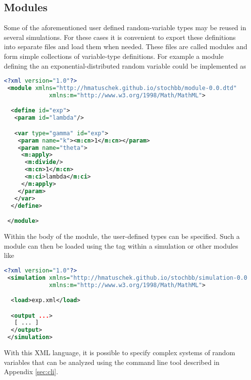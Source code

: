 \subsection{Modules}
Some of the aforementioned user defined random-variable types may be reused in several
simulations. For these cases it is convenient to export these definitions into separate files
and load them when needed. These files are called modules and form simple collections of
variable-type definitions. For example a module defining the an exponential-distributed 
random variable could be implemented as
\begin{lstlisting}[language=XML]
 <?xml version="1.0"?>
 <module xmlns="http://hmatuschek.github.io/stochbb/module-0.0.dtd"
             xmlns:m="http://www.w3.org/1998/Math/MathML">

  <define id="exp">
   <param id="lambda"/>

   <var type="gamma" id="exp">
    <param name="k"><m:cn>1</m:cn></param>
    <param name="theta">
     <m:apply>
      <m:divide/>
      <m:cn>1</m:cn>
      <m:ci>lambda</m:ci>
     </m:apply>
    </param>
   </var>
  </define>

 </module>
\end{lstlisting}

Within the body of the module, the user-defined types can be specified. Such a module can then
be loaded using the  tag within a simulation or other modules like
\begin{lstlisting}[language=XML]
 <?xml version="1.0"?>
 <simulation xmlns="http://hmatuschek.github.io/stochbb/simulation-0.0.dtd"
             xmlns:m="http://www.w3.org/1998/Math/MathML">

  <load>exp.xml</load>

  <output ...>
   [ ... ]
  </output>
 </simulation>
\end{lstlisting}

With this XML language, it is possible to specify complex systems of random variables that can be analyzed 
using the  command line tool described in Appendix \ref{sec:cli}.
